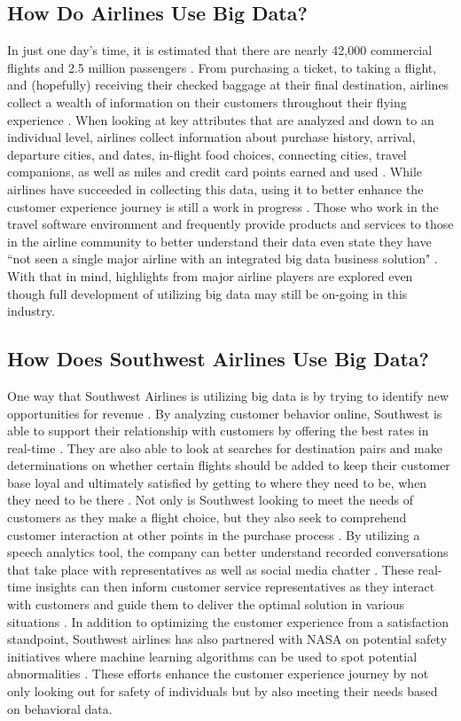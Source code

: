 \documentclass[sigconf]{acmart}
\begin{document}
\subsection{How Do Airlines Use Big Data?}
In just one day's time, it is estimated that there are nearly 42,000 commercial flights and 2.5 million passengers \cite{Administration2017}. From purchasing a ticket, to taking a flight, and (hopefully) receiving their checked baggage at their final destination, airlines collect a wealth of information on their customers throughout their flying experience \cite{Noyes2014}. When looking at key attributes that are analyzed and down to an individual level, airlines collect information about purchase history, arrival, departure cities, and dates, in-flight food choices, connecting cities, travel companions, as well as miles and credit card points earned and used \cite{Exastax2017}. While airlines have succeeded in collecting this data, using it to better enhance the customer experience journey is still a work in progress \cite{Noyes2014}. Those who work in the travel software environment and frequently provide products and services to those in the airline community to better understand their data even state they have ``not seen a single major airline with an integrated big data business solution" \cite{Noyes2014}. With that in mind, highlights from major airline players are explored even though full development of utilizing big data may still be on-going in this industry. 

\subsection{How Does Southwest Airlines Use Big Data?}
 One way that Southwest Airlines is utilizing big data is by trying to identify new opportunities for revenue \cite{Noyes2014}. By analyzing customer behavior online, Southwest is able to support their relationship with customers by offering the best rates in real-time \cite{Noyes2014}. They are also able to look at searches for destination pairs and make determinations on whether certain flights should be added to keep their customer base loyal and ultimately satisfied by getting to where they need to be, when they need to be there \cite{Exastax2017}. Not only is Southwest looking to meet the needs of customers as they make a flight choice, but they also seek to comprehend customer interaction at other points in the purchase process \cite{Exastax2017}. By utilizing a speech analytics tool, the company can better understand recorded conversations that take place with representatives as well as social media chatter \cite{Exastax2017}. These real-time insights can then inform customer service representatives as they interact with customers and guide them to deliver the optimal solution in various situations \cite{Exastax2017}. In addition to optimizing the customer experience from a satisfaction standpoint, Southwest airlines has also partnered with NASA on potential safety initiatives where machine learning algorithms can be used to spot potential abnormalities \cite{Exastax2017}. These efforts enhance the customer experience journey by not only looking out for safety of individuals but by also meeting their needs based on behavioral data. 
\end{document}
